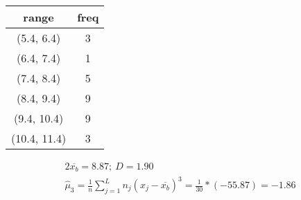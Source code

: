\documentclass{article}%
\begin{document}
%
\normalsize%
\begin{tabular}{c|c}
\toprule
       range &  freq \\
\midrule
  (5.4, 6.4) &     3 \\
  (6.4, 7.4) &     1 \\
  (7.4, 8.4) &     5 \\
  (8.4, 9.4) &     9 \\
 (9.4, 10.4) &     9 \\
(10.4, 11.4) &     3 \\
\bottomrule
\end{tabular}
%
\begin{alignat*}{2}%
\overline {{ x_{{b}} }} = 8.87%
;~ D = 1.90%
\\ \hat{\mu}_3
             = \frac 1 n \sum\limits_{j = 1}^L {n_j (x_j - \overline {{ x_{{b}} }})^3}
             = \frac 1 { 30 } * (-55.87)
             = -1.86
\end{alignat*}%
\end{document}
